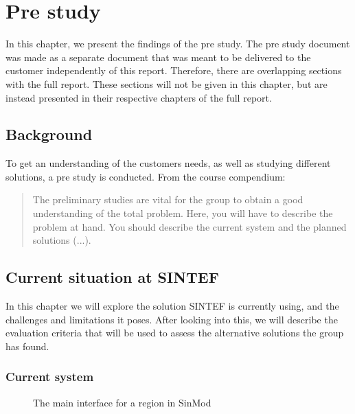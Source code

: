 \documentclass[11pt,a4paper,titlepage,oneside]{report}
\begin{document}
\chapter{Pre study}
In this chapter, we present the findings of the pre study. The pre study document was made as a separate document that was meant to be delivered to the customer independently of this report. Therefore, there are overlapping sections with the full report. These sections will not be given in this chapter, but are instead presented in their respective chapters of the full report. 

\section{Background}
To get an understanding of the customers needs, as well as studying different solutions, a pre study is conducted. From the \gls{course compendium}:
\begin{quote}
The preliminary studies are vital for the group to obtain a good understanding of the total problem.
Here, you will have to describe the problem at hand. You should describe the current system and the
planned solutions (...).
\cite{TDT4290:Intro}
\end{quote}

\section{Current situation at SINTEF}
In this chapter we will explore the solution SINTEF is currently using, and the challenges and limitations it poses. After looking into this, we will describe the evaluation criteria that will be used to assess the alternative solutions the group has found. 
\subsection{Current system}
\begin{figure}[h]
\begin{center}
\caption{The main interface for a region in SinMod}
\label{fig:sinmod-region-main-interface}
\end{center}
\end{figure}
\end{document}
